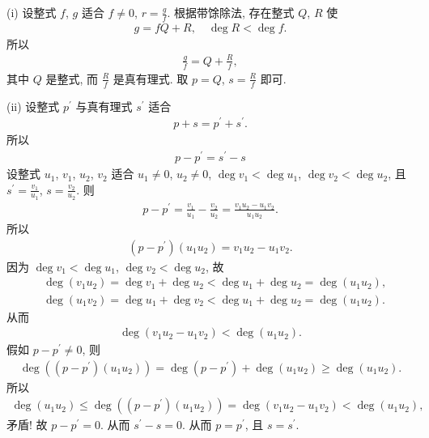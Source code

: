 \begin{pf}
    (i) 设整式 $f$, $g$ 适合 $f \neq 0$, $r = \frac{g}{f}$. 根据带馀除法, 存在整式 $Q$, $R$ 使
    \begin{align*}
        g = fQ + R, \quad \deg R < \deg f.
    \end{align*}
    所以
    \begin{align*}
        \frac{g}{f} = Q + \frac{R}{f},
    \end{align*}
    其中 $Q$ 是整式, 而 $\frac{R}{f}$ 是真有理式. 取 $p = Q$, $s = \frac{R}{f}$ 即可.

    (ii) 设整式 $p^{\prime}$ 与真有理式 $s^{\prime}$ 适合
    \begin{align*}
        p + s = p^{\prime} + s^{\prime}.
    \end{align*}
    所以
    \begin{align*}
        p - p^{\prime} = s^{\prime} - s
    \end{align*}
    设整式 $u_1$, $v_1$, $u_2$, $v_2$ 适合 $u_1 \neq 0$, $u_2 \neq 0$, $\deg v_1 < \deg u_1$, $\deg v_2 < \deg u_2$, 且 $s^{\prime} = \frac{v_1}{u_1}$, $s = \frac{v_2}{u_2}$. 则
    \begin{align*}
        p - p^{\prime} = \frac{v_1}{u_1} - \frac{v_2}{u_2} = \frac{v_1 u_2 - u_1 v_2}{u_1 u_2}.
    \end{align*}
    所以
    \begin{align*}
        (p - p^{\prime}) (u_1 u_2) = v_1 u_2 - u_1 v_2.
    \end{align*}
    因为 $\deg v_1 < \deg u_1$, $\deg v_2 < \deg u_2$, 故
    \begin{align*}
         & \deg {(v_1 u_2)} = \deg v_1 + \deg u_2 < \deg u_1 + \deg u_2 = \deg {(u_1 u_2)}, \\
         & \deg {(u_1 v_2)} = \deg u_1 + \deg v_2 < \deg u_1 + \deg u_2 = \deg {(u_1 u_2)}.
    \end{align*}
    从而
    \begin{align*}
        \deg {(v_1 u_2 - u_1 v_2)} < \deg {(u_1 u_2)}.
    \end{align*}
    假如 $p - p^{\prime} \neq 0$, 则
    \begin{align*}
        \deg {((p - p^{\prime})(u_1 u_2))} = \deg {(p - p^{\prime})} + \deg {(u_1 u_2)} \geq \deg {(u_1 u_2)}.
    \end{align*}
    所以
    \begin{align*}
        \deg {(u_1 u_2)} \leq \deg {((p - p^{\prime})(u_1 u_2))} = \deg {(v_1 u_2 - u_1 v_2)} < \deg {(u_1 u_2)},
    \end{align*}
    矛盾! 故 $p - p^{\prime} = 0$. 从而 $s^{\prime} - s = 0$. 从而 $p = p^{\prime}$, 且 $s = s^{\prime}$.
\end{pf}

